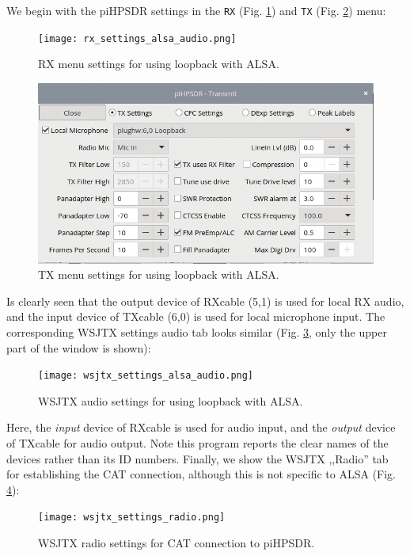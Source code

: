 \documentclass[12pt]{book}
\def\bltt#1{\texttt{\color{blue}#1}}
\def\pH{pi\-HPSDR\xspace}
\begin{document}
We begin with the \pH settings in the \bltt{RX} (Fig. \ref{fig:rx_settings_alsa_audio}) and
\bltt{TX} (Fig. \ref{fig:tx_settings_alsa_audio}) menu:

\begin{figure}[ht]
\center
\texttt{[image: rx\_settings\_alsa\_audio.png]}
\caption{RX menu settings for using loopback with ALSA.}
\label{fig:rx_settings_alsa_audio}
\end{figure}

\begin{figure}[ht]
\center
\includegraphics[scale=0.45]{tx_settings_alsa_audio.png}
\caption{TX menu settings for using loopback with ALSA.}
\label{fig:tx_settings_alsa_audio}
\end{figure}

Is clearly seen that the output device of RXcable (5,1) is used for local RX audio, and the input
device of TXcable (6,0) is used for local microphone input. The corresponding WSJTX settings audio
tab looks similar (Fig. \ref{fig:wsjtx_settings_alsa_audio}, only the upper part of the
window is shown):

\begin{figure}[ht]
\center
\texttt{[image: wsjtx\_settings\_alsa\_audio.png]}
\caption{WSJTX audio settings for using loopback with ALSA.}
\label{fig:wsjtx_settings_alsa_audio}
\end{figure}

Here, the \textit{input} device of RXcable is used for audio input, and the
\textit{output} device of TXcable for audio output. Note this program reports the
clear names of the devices rather than its ID numbers. Finally, we show the WSJTX ,,Radio''
tab for establishing the CAT connection, although this is not specific to ALSA
(Fig. \ref{fig:wsjtx_settings_radio}):

\begin{figure}[ht]
\center
\texttt{[image: wsjtx\_settings\_radio.png]}
\caption{WSJTX radio settings for CAT connection to \pH.}
\label{fig:wsjtx_settings_radio}
\end{figure}
\end{document}
